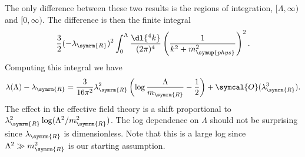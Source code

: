 \documentclass[fleqn]{NotesClass}
\newcommand{\order}{\symcal{O}}
\newcommand{\phys}{\symup{phys}}
\newcommand{\renormalised}{\symrm{R}}
\begin{document}
    The only difference between these two results is the regions of integration, \([\Lambda, \infty)\) and \([0, \infty)\).
    The difference is then the finite integral
    \begin{equation}
        \frac{3}{2}(-\lambda_{\renormalised})^2 \int_0^{\Lambda} \frac{\dl{^4k}}{(2\pi)^4} \left( \frac{1}{k^2 + m_{\phys}^2} \right)^2.
    \end{equation}
    Computing this integral we have
    \begin{equation}
        \lambda(\Lambda) - \lambda_{\renormalised} = \frac{3}{16\pi^2} \lambda_{\renormalised}^2 \left( \log\frac{\Lambda}{m_{\renormalised}} - \frac{1}{2} \right) + \order(\lambda_{\renormalised}^3).
    \end{equation}
    The effect in the effective field theory is a shift proportional to \(\lambda_{\renormalised}^2\log(\Lambda^2/m_{\renormalised}^2)\).
    The log dependence on \(\Lambda\) should not be surprising since \(\lambda_{\renormalised}\) is dimensionless.
    Note that this is a large log since \(\Lambda^2 \gg m_{\renormalised}^2\) is our starting assumption.
    
\end{document}
